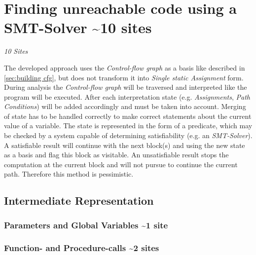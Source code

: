 
% 
\chapter{Finding unreachable code using a SMT-Solver \textasciitilde 10 sites}
\label{cha:finding unreachable code using a smt-solver}
\emph{10 Sites}

The developed approach uses the \emph{Control-flow graph} as a basis like described in \ref{sec:building cfg}, but does not transform it into \emph{Single static Assignment} form.
During analysis the \emph{Control-flow graph} will be traversed and interpreted like the program will be executed.
After each interpretation state (e.g. \emph{Assignments}, \emph{Path Conditions}) will be added accordingly and must be taken into account.
Merging of state has to be handled correctly to make correct statements about the current value of a variable.
The state is represented in the form of a predicate, which may be checked by a system capable of determining satisfiability (e.g. an \emph{SMT-Solver}).
A satisfiable result will continue with the next block(s) and using the new state as a basis and flag this block as visitable.
An unsatisfiable result stops the computation at the current block and will not pursue to continue the current path.
Therefore this method is pessimistic.


\section{Intermediate Representation}
\subsection{Parameters and Global Variables \textasciitilde 1 site}
\subsection{Function- and Procedure-calls \textasciitilde 2 sites}
